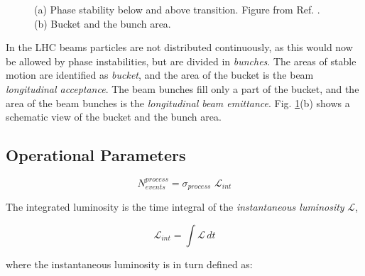 \begin{figure}[ht]
\centering
{}
\caption{(a) Phase stability below and above transition. Figure from Ref. \cite{Tecker:2016mlq}. (b) Bucket and the bunch area.}
\label{fig:lhc:phase}
\end{figure}


In the LHC beams particles are not distributed continuously, as this would now be allowed by phase instabilities, but are divided in \textit{bunches}. 
The areas of stable motion are identified as \textit{bucket}, and the area of the bucket is the beam \textit{longitudinal acceptance}. The beam bunches fill only a part of the bucket, and the area of the beam bunches is the \textit{longitudinal beam emittance}. Fig. \ref{fig:lhc:phase}(b) shows a schematic view of the bucket and the bunch area.

\subsection{Operational Parameters}

\begin{equation}
\label{eq:cern:nev}
N_{events}^{process} = \sigma_{process} \,\, \mathcal{L}_{int}
\end{equation}

The integrated luminosity is the time integral of the \textit{instantaneous luminosity} $\mathcal{L}$, 

\begin{equation}
\label{eq:cern:intlumi}
\mathcal{L}_{int} = \int \mathcal{L} \, dt
\end{equation}

where the instantaneous luminosity is in turn defined as:

